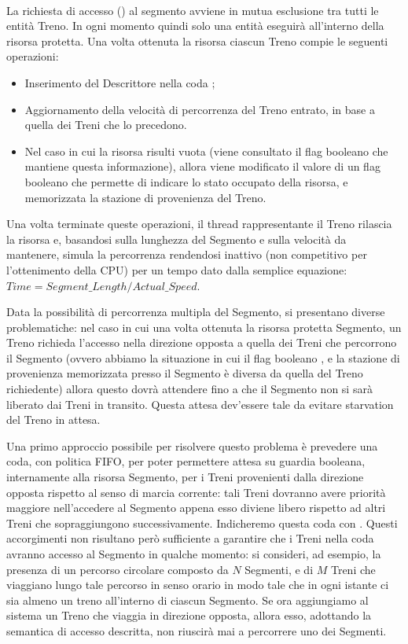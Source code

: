 		\begin{description}
			
			\item {} \\
			
			La richiesta di accesso () al segmento avviene in mutua esclusione tra tutti le entità Treno. In ogni momento quindi solo una entità eseguirà all'interno della risorsa protetta. Una volta ottenuta la risorsa ciascun Treno compie le seguenti operazioni:
			 \begin{itemize}
			 	\item Inserimento del Descrittore nella coda ;
			 	\item Aggiornamento della velocità di percorrenza del Treno entrato, in base a quella dei Treni che lo precedono.
			 	\item Nel caso in cui la risorsa risulti vuota (viene consultato il flag booleano che mantiene questa informazione), allora viene modificato il valore di un flag booleano  che permette di indicare lo stato occupato della risorsa, e memorizzata la stazione di provenienza del Treno.
			\end{itemize}
			Una volta terminate queste operazioni, il thread rappresentante il Treno rilascia la risorsa e, basandosi sulla lunghezza del Segmento e sulla velocità da mantenere, simula la percorrenza rendendosi inattivo (non competitivo per l'ottenimento della CPU) per un tempo dato dalla semplice equazione: $ Time = Segment\_Length / Actual\_Speed $.
			
			Data la possibilità di percorrenza multipla del Segmento, si presentano diverse problematiche: nel caso in cui una volta ottenuta la risorsa protetta Segmento, un Treno richieda l'accesso nella direzione opposta a quella dei Treni che percorrono il Segmento (ovvero abbiamo la situazione in cui il flag booleano , e la stazione di provenienza memorizzata presso il Segmento è diversa da quella del Treno richiedente) allora questo dovrà attendere fino a che il Segmento non si sarà liberato dai Treni in transito. Questa attesa dev'essere tale da evitare starvation del Treno in attesa.
			
			Una primo approccio possibile per risolvere questo problema è prevedere una coda, con politica FIFO, per poter permettere attesa su guardia booleana, internamente alla risorsa Segmento, per i Treni provenienti dalla direzione opposta rispetto al senso di marcia corrente: tali Treni dovranno avere priorità maggiore nell'accedere al Segmento appena esso diviene libero rispetto ad altri Treni che sopraggiungono successivamente. Indicheremo questa coda con .
			Questi accorgimenti non risultano però sufficiente a garantire che i Treni nella coda avranno accesso al Segmento in qualche momento: si consideri, ad esempio, la presenza di un percorso circolare composto da $N$ Segmenti, e di $M$ Treni che viaggiano lungo tale percorso in senso orario in modo tale che in ogni istante ci sia almeno un treno all'interno di ciascun Segmento. Se ora aggiungiamo al sistema un Treno che viaggia in direzione opposta, allora esso, adottando la semantica di accesso descritta, non riuscirà mai a percorrere uno dei Segmenti.			
			

\end{description}
